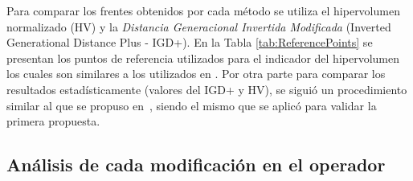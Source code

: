 Para comparar los frentes obtenidos por cada método se utiliza el hipervolumen normalizado (HV) y la 
\textit{Distancia Generacional Invertida Modificada} (Inverted Generational Distance Plus - IGD+).
%
En la Tabla \ref{tab:ReferencePoints} se presentan los puntos de referencia utilizados para el indicador del hipervolumen los cuales son similares 
a los utilizados en \cite{Joel:Kuhn_Munkres, Joel:OperatorAHX}.
%
Por otra parte para comparar los resultados estadísticamente (valores del IGD+ y HV), se siguió un procedimiento similar al que se propuso en~\cite{Joel:StatisticalTest},
siendo el mismo que se aplicó para validar la primera propuesta.
%
%
%
%
%
%
%
%


\subsection{Análisis de cada modificación en el operador \SBX{}}


